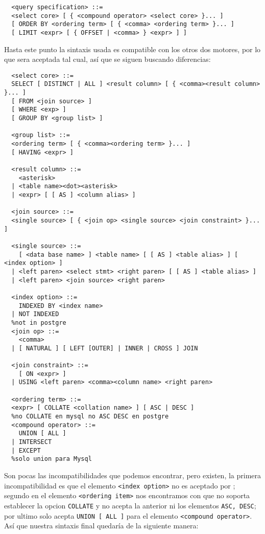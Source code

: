 \begin{Verbatim}
  <query specification> ::=
  <select core> [ { <compound operator> <select core> }... ]
  [ ORDER BY <ordering term> [ { <comma> <ordering term> }... ]
  [ LIMIT <expr> [ { OFFSET | <comma> } <expr> ] ]  
\end{Verbatim}

Hasta este punto la sintaxis usada es compatible con los otros dos motores, por lo que sera aceptada tal cual, así que se siguen buscando diferencias:

\begin{Verbatim}
  <select core> ::=
  SELECT [ DISTINCT | ALL ] <result column> [ { <comma><result column> }... ] 
  [ FROM <join source> ]
  [ WHERE <exp> ]
  [ GROUP BY <group list> ]
  
  <group list> ::=
  <ordering term> [ { <comma><ordering term> }... ]
  [ HAVING <expr> ]
  
  <result column> ::=
    <asterisk>
  | <table name><dot><asterisk>
  | <expr> [ [ AS ] <column alias> ]
  
  <join source> ::=
  <single source> [ { <join op> <single source> <join constraint> }... ]
  
  <single source> ::=
    [ <data base name> ] <table name> [ [ AS ] <table alias> ] [ <index option> ]
  | <left paren> <select stmt> <right paren> [ [ AS ] <table alias> ]
  | <left paren> <join source> <right paren>
  
  <index option> ::=
    INDEXED BY <index name> 
  | NOT INDEXED
  %not in postgre
  <join op> ::=
    <comma>
  | [ NATURAL ] [ LEFT [OUTER] | INNER | CROSS ] JOIN
  
  <join constraint> ::=
    [ ON <expr> ]
  | USING <left paren> <comma><column name> <right paren>
  
  <ordering term> ::=
  <expr> [ COLLATE <collation name> ] [ ASC | DESC ]
  %no COLLATE en mysql no ASC DESC en postgre
  <compound operator> ::=
    UNION [ ALL ]
  | INTERSECT 
  | EXCEPT
  %solo union para Mysql
\end{Verbatim}
Son pocas las incompatibilidades que podemos encontrar, pero existen, la primera incompatibilidad es que el elemento \verb=<index option>= no es aceptado por \p; segundo en el elemento \verb=<ordering item>= nos encontramos con que \m no soporta establecer la opcion \verb=COLLATE= y \p no acepta la anterior ni los elementos \verb=ASC, DESC=; por ultimo \m solo acepta \verb=UNION [ ALL ]= para el elemento \verb=<compound operator>=. Así que nuestra sintaxis final quedaría de la siguiente manera:  

